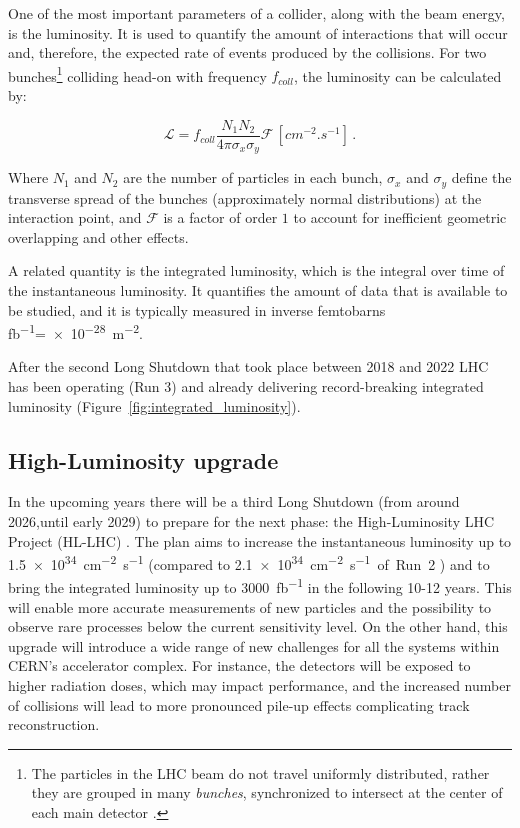 One of the most important parameters of a collider, along with the beam energy, is the luminosity. It is used to quantify the amount of interactions that will occur and, therefore, the expected rate of events produced by the collisions. For two bunches\footnote{\label{footnote:particle_beam_bunches} The particles in the LHC beam do not travel uniformly distributed, rather they are grouped in many \textit{bunches}, synchronized to intersect at the center of each main detector%
.} colliding head-on with frequency \(f_{coll}\), the luminosity can be calculated by:

\begin{equation}
    \mathcal{L} = f_{coll}\frac{N_1 N_2}{4\pi \sigma_x \sigma_y} \mathcal{F} \, \left[\unit{cm^{-2}.s^{-1}}\right] \, .
\end{equation}

Where \(N_1\) and \(N_2\) are the number of particles in each bunch, \(\sigma_x\) and \(\sigma_y\) define the transverse spread of the bunches (approximately normal distributions) at the interaction point, and \(\mathcal{F}\) is a factor of order \(1\) to account for inefficient geometric overlapping and other effects.

A related quantity is the integrated luminosity, which is the integral over time of the instantaneous luminosity. It quantifies the amount of data that is available to be studied, and it is typically measured in inverse femtobarns \unit{\femto\barn^{-1}}=\qty{e-28}{\meter^{-2}}.

After the second Long Shutdown that took place between 2018 and 2022 LHC has been operating (Run 3) and already delivering record-breaking integrated luminosity (Figure~\ref{fig:integrated_luminosity}).

\subsection{High-Luminosity upgrade}\label{subsec:high_luminosity_upgrade}
In the upcoming years there will be a third Long Shutdown (from around 2026,until early 2029) to prepare for the next phase: the High-Luminosity LHC Project (HL-LHC) \cite{cernHLLHCProject}. The plan aims to increase the instantaneous luminosity up to \qty{1.5e34}{\centi\meter^{-2}\second^{-1}} (compared to \qty{2.1e34}{\centi\meter^{-2}\second^{-1} of Run 2} \cite{CERN-LHCC-2020-007}) and to bring the integrated luminosity up to \qty{3000}{\femto\barn^{-1}} in the following 10-12 years. This will enable more accurate measurements of new particles and the possibility to observe rare processes below the current sensitivity level. On the other hand, this upgrade will introduce a wide range of new challenges for all the systems within CERN's accelerator complex. For instance, the detectors will be exposed to higher radiation doses, which may impact performance, and the increased number of collisions will lead to more pronounced pile-up effects complicating track reconstruction.

